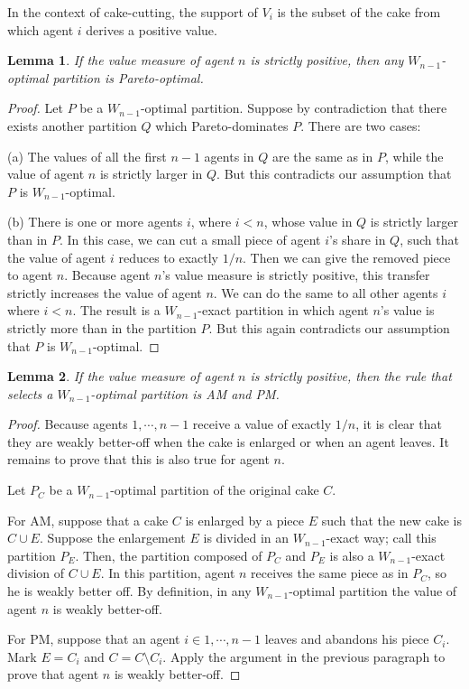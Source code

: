 \documentclass[a4paper,12pt]{article}
\newtheorem{lemma}{Lemma}[section]
\begin{document}
In the context of cake-cutting, the support of $V_i$ is the subset of the cake from which agent $i$ derives a positive value.

\begin{lemma}
\label{lemma:W-optimal-is-PO}
If the value measure of agent $n$ is strictly positive, then any $W_{n-1}$-optimal partition is Pareto-optimal.
\end{lemma}
\begin{proof}
Let $P$ be a $W_{n-1}$-optimal partition. Suppose by contradiction that there exists another partition $Q$ which Pareto-dominates $P$. There are two cases:

(a) The values of all the first $n-1$ agents in $Q$ are the same as in $P$, while the value of agent $n$ is strictly larger in $Q$. But this contradicts our assumption that $P$ is $W_{n-1}$-optimal.

(b) There is one or more agents $i$, where $i<n$, whose value in $Q$ is strictly larger than in $P$. In this case, we can cut a small piece of agent $i$'s share in $Q$, such that the value of agent $i$ reduces to exactly $1/n$. Then we can give the removed piece to agent $n$. Because agent $n$'s value measure is strictly positive, this transfer strictly increases the value of agent $n$. We can do the same to all other agents $i$ where $i<n$. The result is a $W_{n-1}$-exact partition in which agent $n$'s value is strictly more than in the partition $P$. But this again contradicts our assumption that $P$ is $W_{n-1}$-optimal.
\end{proof}

\begin{lemma}
If the value measure of agent $n$ is strictly positive, then the rule that selects a $W_{n-1}$-optimal partition is AM and PM.
\end{lemma}
\begin{proof}
Because agents $1,\cdots,n-1$ receive a value of exactly $1/n$, it is clear that they are weakly better-off when the cake is enlarged or when an agent leaves. It remains to prove that this is also true for agent $n$.

Let $P_C$ be a $W_{n-1}$-optimal partition of the original cake $C$.

For AM, suppose that a cake $C$ is enlarged by a piece $E$ such that the new cake is $C\cup E$. Suppose the enlargement $E$ is divided in an $W_{n-1}$-exact way; call this partition $P_E$. Then, the partition composed of $P_C$ and $P_E$ is also a $W_{n-1}$-exact division of $C\cup E$. In this partition, agent $n$ receives the same piece as in $P_C$, so he is weakly better off. By definition, in any $W_{n-1}$-optimal partition the value of agent $n$ is weakly better-off.

For PM, suppose that an agent $i\in 1,\cdots,n-1$ leaves and abandons his piece $C_i$. Mark $E=C_i$ and $C=C\setminus C_i$. Apply the argument in the previous paragraph to prove that agent $n$ is weakly better-off.
\end{proof}
\end{document}
